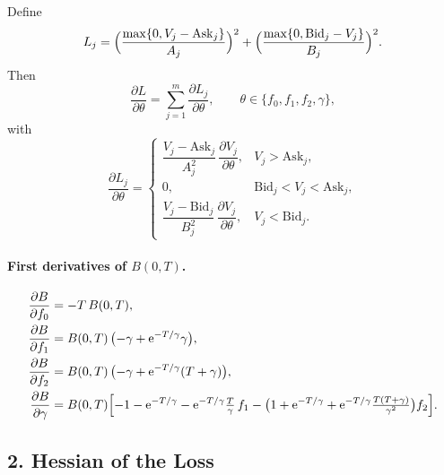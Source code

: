 \documentclass[12pt]{article}
\begin{document}
Define
\[
L_j
 = \Bigl(\frac{\max\{0,V_j-\mathrm{Ask}_j\}}{A_j}\Bigr)^{2}
 + \Bigl(\frac{\max\{0,\mathrm{Bid}_j-V_j\}}{B_j}\Bigr)^{2}.
\]
Then
\begin{equation}
\frac{\partial L}{\partial\theta}
  =\sum_{j=1}^{m}\frac{\partial L_j}{\partial\theta},
  \qquad
  \theta\in\{f_0,f_1,f_2,\gamma\},
\end{equation}
with
\[
\frac{\partial L_j}{\partial\theta}=
\begin{cases}
 \dfrac{V_j-\mathrm{Ask}_j}{A_j^{2}}\,
 \dfrac{\partial V_j}{\partial\theta},
   & V_j>\mathrm{Ask}_j,\\[0.6em]
 0, & \mathrm{Bid}_j<V_j<\mathrm{Ask}_j,\\[0.6em]
 \dfrac{V_j-\mathrm{Bid}_j}{B_j^{2}}\,
 \dfrac{\partial V_j}{\partial\theta},
   & V_j<\mathrm{Bid}_j.
\end{cases}
\]

\paragraph{First derivatives of \(B(0,T)\).}
\begin{align}
\frac{\partial B}{\partial f_0} &= -T\,B(0,T),\\
\frac{\partial B}{\partial f_1} &= B(0,T)\,\bigl(-\gamma+\mathrm{e}^{-T/\gamma}\gamma\bigr),\\
\frac{\partial B}{\partial f_2} &= B(0,T)\,\bigl(-\gamma+\mathrm{e}^{-T/\gamma}(T+\gamma)\bigr),\\
\frac{\partial B}{\partial\gamma} &=
  B(0,T)\Bigl[
    -1-\mathrm{e}^{-T/\gamma}
    -\mathrm{e}^{-T/\gamma}\tfrac{T}{\gamma}\,f_1
    -\bigl(1+\mathrm{e}^{-T/\gamma}
           +\mathrm{e}^{-T/\gamma}\tfrac{T(T+\gamma)}{\gamma^{2}}\bigr)f_2
  \Bigr].
\end{align}

\subsection*{2. Hessian of the Loss}
\end{document}
